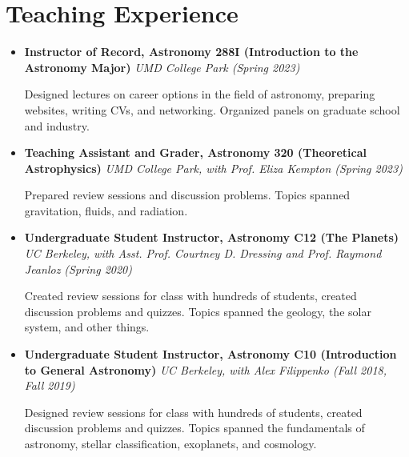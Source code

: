 \documentclass[letterpaper,10.5pt]{article}
\newcommand{\resumeItem}[2]{
  \item\small{
    \textbf{#1}{#2 \vspace{-2pt}}
  }
}
\newcommand{\resumeItemNoBullet}[2]{
  \item[]\small{
    \hspace{-9pt}\textbf{#1}{: #2 \vspace{-6pt}}
  }
}
\newcommand{\resumeSubHeadingListStart}{\begin{itemize}[leftmargin=*]}
\newcommand{\resumeSubHeadingListEnd}{\end{itemize}}
\newcommand{\resumeItemListStart}{\begin{itemize}}
\newcommand{\shorterSection}[1]{\vspace{-10pt}\section{#1}}
\begin{document}






\shorterSection{Teaching Experience}
\resumeItemListStart
\resumeItem{Instructor of Record, Astronomy 288I (Introduction to the Astronomy Major)}{ \textit{UMD College Park (Spring 2023)}}
    
    Designed lectures on career options in the field of astronomy, preparing websites, writing CVs, and networking. Organized panels on graduate school and industry. 
\resumeItem{Teaching Assistant and Grader, Astronomy 320 (Theoretical Astrophysics)}{ \textit{UMD College Park, with Prof. Eliza Kempton (Spring 2023)}}

Prepared review sessions and discussion problems. Topics spanned gravitation, fluids, and radiation.
\resumeItem{Undergraduate Student Instructor, Astronomy C12 (The Planets)}{ \textit{UC Berkeley, with Asst. Prof. Courtney D. Dressing and Prof. Raymond Jeanloz (Spring 2020)}}

Created review sessions for class with hundreds of students, created discussion problems and quizzes. Topics spanned the geology, the solar system, and other things.
\resumeItem{Undergraduate Student Instructor, Astronomy C10 (Introduction to General Astronomy)}{\textit{ UC Berkeley, with Alex Filippenko (Fall 2018, Fall 2019)}}

Designed review sessions for class with hundreds of students, created discussion problems and quizzes. Topics spanned the fundamentals of astronomy, stellar classification, exoplanets, and cosmology.
\resumeSubHeadingListEnd
\end{document}
